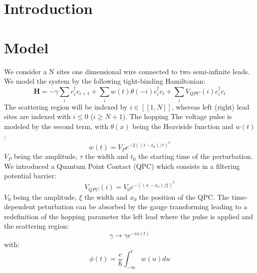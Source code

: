 \documentclass[aps,prl,preprint,groupedaddress]{revtex4-1}
\begin{document}
\section{Introduction}


\section{Model}
%
We consider a N sites one dimensional wire connected to two semi-infinite leads. We model the system by the following tight-binding Hamiltonian:
\begin{equation}
\textbf{H} = -\gamma \sum_{i}c^{\dagger}_i c_{i+1} + \sum_{i} w(t)\theta(-i) c^{\dagger}_i c_{i} + \sum_{i} V_{QPC}(i) c^{\dagger}_i c_{i}
\end{equation}
The scattering region will be indexed by $i \in [\![1,N]\!]$, whereas left (right) lead sites are indexed with $i \leq 0$
($i \geq N+1$). The hopping  The voltage pulse is modeled by the second term, with $\theta(x)$ being the Heaviside function and $w(t)$:
\begin{equation}
w(t) = V_P e^{-2((t-t_0)/\tau)^2}
\end{equation}
$V_P$ being the amplitude, $\tau$ the width and $t_0$ the starting time of the perturbation. We introduced a Quantum Point Contact (QPC) which consists in a filtering potential barrier:
\begin{equation}
V_{QPC}(i) = V_0 e^{-((x-x_0)/\xi)^2}
\end{equation}
$V_0$ being the amplitude, $\xi$ the width and $x_0$ the position of the QPC.
The time-dependent peturbation can be absorbed by the gauge transforming leading to a redefinition of the hopping parameter the left lead where the pulse is applied and the scattering region:
\begin{equation}
\gamma \rightarrow \gamma e^{-i\phi(t)}
\end{equation}
with:
\begin{equation}
\phi(t) = \frac{e}{\hbar}\int_{-\infty}^{t} w(u)du
\end{equation}
\end{document}
